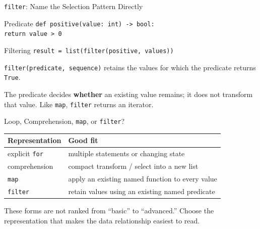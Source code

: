 \documentclass[aspectratio=169,10pt]{beamer}
\begin{document}
\begin{frame}{\texttt{filter}: Name the Selection Pattern Directly}
  \begin{block}{Predicate}
    \texttt{def positive(value: int) -> bool:}\\
    \hspace*{0.20in}\texttt{return value > 0}
  \end{block}

  \begin{block}{Filtering}
    \texttt{result = list(filter(positive, values))}
  \end{block}

  \begin{cpdefinition}
    \texttt{filter(predicate, sequence)} retains the values for which the predicate returns \texttt{True}.
  \end{cpdefinition}

  The predicate decides \textbf{whether} an existing value remains; it does not transform that value. Like \texttt{map}, \texttt{filter} returns an iterator.
\end{frame}

\begin{frame}{Loop, Comprehension, \texttt{map}, or \texttt{filter}?}
  \begin{center}
    \renewcommand{\arraystretch}{1.25}
    \begin{tabular}{l|l}
      \textbf{Representation} & \textbf{Good fit} \\\hline
      explicit \texttt{for} & multiple statements or changing state \\
      comprehension & compact transform / select into a new list \\
      \texttt{map} & apply an existing named function to every value \\
      \texttt{filter} & retain values using an existing named predicate
    \end{tabular}
  \end{center}

  \begin{keyidea}
    These forms are not ranked from ``basic'' to ``advanced.'' Choose the representation that makes the data relationship easiest to read.
  \end{keyidea}
\end{frame}
\end{document}
